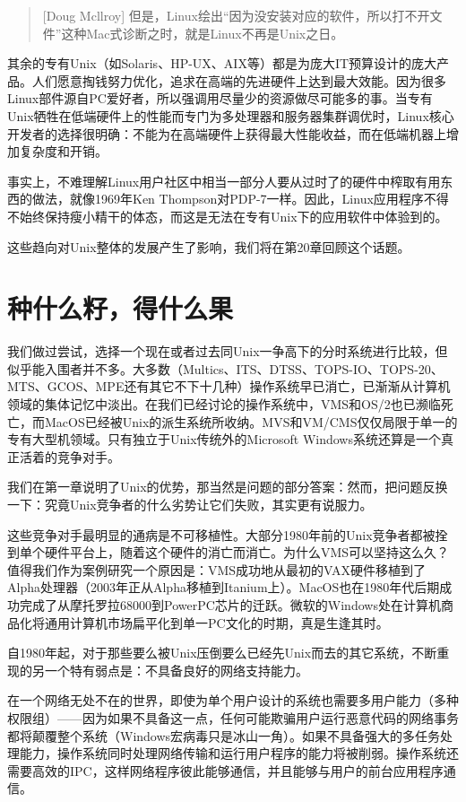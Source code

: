 \documentclass[12pt,oneside]{book}
\begin{document}
\begin{common-format}
\begin{quote}[Doug Mcllroy]
但是，Linux绘出“因为没安装对应的软件，所以打不开文件”这种Mac式诊断之时，就是Linux不再是Unix之日。
\end{quote}

其余的专有Unix（如Solaris、HP-UX、AIX等）都是为庞大IT预算设计的庞大产品。人们愿意掏钱努力优化，追求在高端的先进硬件上达到最大效能。因为很多Linux部件源自PC爱好者，所以强调用尽量少的资源做尽可能多的事。当专有Unix牺牲在低端硬件上的性能而专门为多处理器和服务器集群调优时，Linux核心开发者的选择很明确：不能为在高端硬件上获得最大性能收益，而在低端机器上增加复杂度和开销。

事实上，不难理解Linux用户社区中相当一部分人要从过时了的硬件中榨取有用东西的做法，就像1969年Ken Thompson对PDP-7一样。因此，Linux应用程序不得不始终保持瘦小精干的体态，而这是无法在专有Unix下的应用软件中体验到的。

这些趋向对Unix整体的发展产生了影响，我们将在第20章回顾这个话题。


\section{种什么籽，得什么果}
我们做过尝试，选择一个现在或者过去同Unix一争高下的分时系统进行比较，但似乎能入围者并不多。大多数（Multics、ITS、DTSS、TOPS-IO、TOPS-20、MTS、GCOS、MPE还有其它不下十几种）操作系统早已消亡，已渐渐从计算机领域的集体记忆中淡出。在我们已经讨论的操作系统中，VMS和OS/2也已濒临死亡，而MacOS已经被Unix的派生系统所收纳。MVS和VM/CMS仅仅局限于单一的专有大型机领域。只有独立于Unix传统外的Microsoft Windows系统还算是一个真正活着的竞争对手。

我们在第一章说明了Unix的优势，那当然是问题的部分答案：然而，把问题反换一下：究竟Unix竞争者的什么劣势让它们失败，其实更有说服力。

这些竞争对手最明显的通病是不可移植性。大部分1980年前的Unix竞争者都被拴到单个硬件平台上，随着这个硬件的消亡而消亡。为什么VMS可以坚持这么久？值得我们作为案例研究一个原因是：VMS成功地从最初的VAX硬件移植到了Alpha处理器（2003年正从Alpha移植到Itanium上）。MacOS也在1980年代后期成功完成了从摩托罗拉68000到PowerPC芯片的迁跃。微软的Windows处在计算机商品化将通用计算机市场扁平化到单一PC文化的时期，真是生逢其时。

自1980年起，对于那些要么被Unix压倒要么已经先Unix而去的其它系统，不断重现的另一个特有弱点是：不具备良好的网络支持能力。

在一个网络无处不在的世界，即使为单个用户设计的系统也需要多用户能力（多种权限组）——因为如果不具备这一点，任何可能欺骗用户运行恶意代码的网络事务都将颠覆整个系统（Windows宏病毒只是冰山一角）。如果不具备强大的多任务处理能力，操作系统同时处理网络传输和运行用户程序的能力将被削弱。操作系统还需要高效的IPC，这样网络程序彼此能够通信，并且能够与用户的前台应用程序通信。


\end{common-format}
\end{document}
